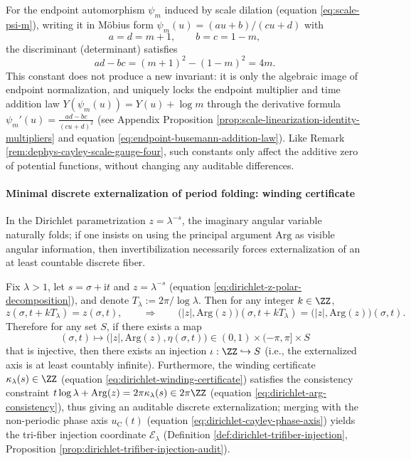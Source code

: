 \begin{remark}\label{rem:dephys-psi-discriminant-locks-time}
For the endpoint automorphism \(\psi_m\) induced by scale dilation (equation \eqref{eq:scale-psi-m}), writing it in Möbius form \(\psi_m(u)=(au+b)/(cu+d)\) with
\[
a=d=m+1,\qquad b=c=1-m,
\]
the discriminant (determinant) satisfies
\[
\boxed{\;ad-bc=(m+1)^2-(1-m)^2=4m.\;}
\]
This constant does not produce a new invariant: it is only the algebraic image of endpoint normalization, and uniquely locks the endpoint multiplier and time addition law \(Y(\psi_m(u))=Y(u)+\log m\) through the derivative formula
\(
\psi_m'(u)=\frac{ad-bc}{(cu+d)^2}
\)
(see Appendix Proposition \ref{prop:scale-linearization-identity-multipliers} and equation \eqref{eq:endpoint-busemann-addition-law}).
Like Remark \ref{rem:dephys-cayley-scale-gauge-four}, such constants only affect the additive zero of potential functions, without changing any auditable differences.
\end{remark}

\paragraph{Minimal discrete externalization of period folding: winding certificate}
In the Dirichlet parametrization \(z=\lambda^{-s}\), the imaginary angular variable naturally folds; if one insists on using the principal argument \(\mathrm{Arg}\) as visible angular information, then invertibilization necessarily forces externalization of an at least countable discrete fiber.

\begin{theorem}\label{thm:dephys-dirichlet-winding-minimal}
Fix \(\lambda>1\), let \(s=\sigma+\mathrm{i}t\) and \(z=\lambda^{-s}\) (equation \eqref{eq:dirichlet-z-polar-decomposition}), and denote \(T_{\lambda}:=2\pi/\log\lambda\).
Then for any integer \(k\in\ZZ\),
\[
z(\sigma,t+kT_{\lambda})=z(\sigma,t),
\qquad\Longrightarrow\qquad
\bigl(|z|,\mathrm{Arg}(z)\bigr)(\sigma,t+kT_{\lambda})=\bigl(|z|,\mathrm{Arg}(z)\bigr)(\sigma,t).
\]
Therefore for any set \(S\), if there exists a map
\[
(\sigma,t)\longmapsto \bigl(|z|,\mathrm{Arg}(z),\eta(\sigma,t)\bigr)\in (0,1)\times(-\pi,\pi]\times S
\]
that is injective, then there exists an injection \(\iota:\ZZ\hookrightarrow S\) (i.e., the externalized axis is at least countably infinite).
Furthermore, the winding certificate \(\kappa_{\lambda}(s)\in\ZZ\) (equation \eqref{eq:dirichlet-winding-certificate}) satisfies the consistency constraint
\(
t\log\lambda+\mathrm{Arg}(z)=2\pi\kappa_{\lambda}(s)\in 2\pi\ZZ
\)
(equation \eqref{eq:dirichlet-arg-consistency}), thus giving an auditable discrete externalization; merging with the non-periodic phase axis \(u_{\mathrm C}(t)\) (equation \eqref{eq:dirichlet-cayley-phase-axis}) yields the tri-fiber injection coordinate \(\mathcal{E}_{\lambda}\) (Definition \ref{def:dirichlet-trifiber-injection}, Proposition \ref{prop:dirichlet-trifiber-injection-audit}).
\end{theorem}

